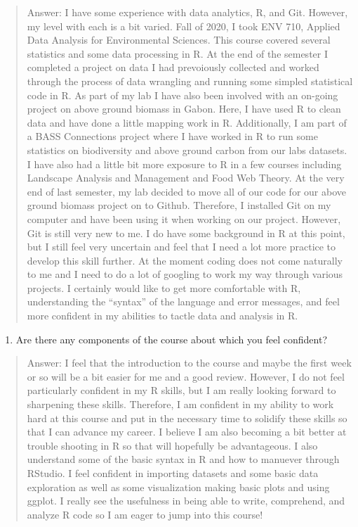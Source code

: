 \documentclass[
]{article}
\providecommand{\tightlist}{%
  \setlength{\itemsep}{0pt}\setlength{\parskip}{0pt}}
\begin{document}
\begin{quote}
Answer: I have some experience with data analytics, R, and Git. However,
my level with each is a bit varied. Fall of 2020, I took ENV 710,
Applied Data Analysis for Environmental Sciences. This course covered
several statistics and some data processing in R. At the end of the
semester I completed a project on data I had prevoiously collected and
worked through the process of data wrangling and running some simpled
statistical code in R. As part of my lab I have also been involved with
an on-going project on above ground biomass in Gabon. Here, I have used
R to clean data and have done a little mapping work in R. Additionally,
I am part of a BASS Connections project where I have worked in R to run
some statistics on biodiversity and above ground carbon from our labs
datasets. I have also had a little bit more exposure to R in a few
courses including Landscape Analysis and Management and Food Web Theory.
At the very end of last semester, my lab decided to move all of our code
for our above ground biomass project on to Github. Therefore, I
installed Git on my computer and have been using it when working on our
project. However, Git is still very new to me. I do have some background
in R at this point, but I still feel very uncertain and feel that I need
a lot more practice to develop this skill further. At the moment coding
does not come naturally to me and I need to do a lot of googling to work
my way through various projects. I certainly would like to get more
comfortable with R, understanding the ``syntax'' of the language and
error messages, and feel more confident in my abilities to tactle data
and analysis in R.
\end{quote}

\begin{enumerate}
\def\labelenumi{\arabic{enumi}.}
\setcounter{enumi}{1}
\tightlist
\item
  Are there any components of the course about which you feel confident?
\end{enumerate}

\begin{quote}
Answer: I feel that the introduction to the course and maybe the first
week or so will be a bit easier for me and a good review. However, I do
not feel particularly confident in my R skills, but I am really looking
forward to sharpening these skills. Therefore, I am confident in my
ability to work hard at this course and put in the necessary time to
solidify these skills so that I can advance my career. I believe I am
also becoming a bit better at trouble shooting in R so that will
hopefully be advantageous. I also understand some of the basic syntax in
R and how to manuever through RStudio. I feel confident in importing
datasets and some basic data exploration as well as some visualization
making basic plots and using ggplot. I really see the usefulness in
being able to write, comprehend, and analyze R code so I am eager to
jump into this course!
\end{quote}
\end{document}
